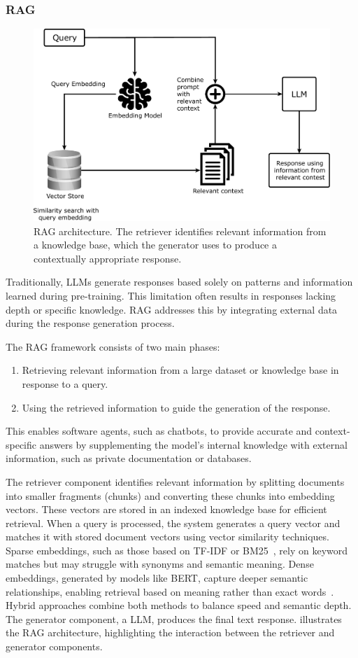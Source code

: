 \subsubsection{\gls{RAG}}
%
\begin{figure}
    \centering
    \includegraphics[width=0.8\linewidth]{figures/rag-architecture}
    \caption{
        \gls{RAG} architecture.
        The retriever identifies relevant information from a knowledge base, which the generator uses to produce a contextually appropriate response.
    }
    \label{fig:rag-architecture}
\end{figure}
%
Traditionally, \glspl{LLM} generate responses based solely on patterns and information learned during pre-training.
%
This limitation often results in responses lacking depth or specific knowledge.
%
\gls{RAG} addresses this by integrating external data during the response generation process.

The \gls{RAG} framework consists of two main phases:
%
\begin{enumerate}
    \item Retrieving relevant information from a large dataset or knowledge base in response to a query.
    \item Using the retrieved information to guide the generation of the response.
\end{enumerate}
%
This enables software agents, such as chatbots, to provide accurate and context-specific answers by supplementing the model's internal knowledge with external information, such as private documentation or databases.

The retriever component identifies relevant information by splitting documents into smaller fragments (chunks) and converting these chunks into embedding vectors.
%
These vectors are stored in an indexed knowledge base for efficient retrieval.
%
When a query is processed, the system generates a query vector and matches it with stored document vectors using vector similarity techniques.
%
Sparse embeddings, such as those based on TF-IDF or BM25~\cite{PLACEHOLDER3}, rely on keyword matches but may struggle with synonyms and semantic meaning.
%
Dense embeddings, generated by models like \gls{BERT}, capture deeper semantic relationships, enabling retrieval based on meaning rather than exact words~\cite{PLACEHOLDER4}.
%
Hybrid approaches combine both methods to balance speed and semantic depth.
%
The generator component, a \gls{LLM}, produces the final text response.
%
 illustrates the \gls{RAG} architecture, highlighting the interaction between the retriever and generator components.


